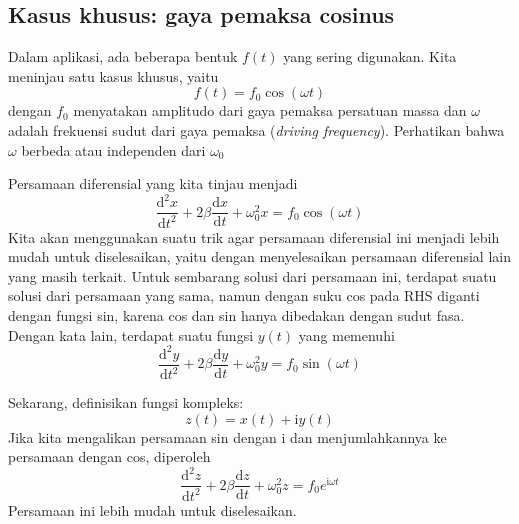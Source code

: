 \subsection{Kasus khusus: gaya pemaksa cosinus}

Dalam aplikasi, ada beberapa bentuk $f(t)$ yang sering digunakan.
Kita meninjau satu kasus khusus, yaitu
\begin{equation}
f(t) = f_{0}\cos(\omega t)
\end{equation}
dengan $f_{0}$ menyatakan amplitudo dari gaya pemaksa persatuan massa
dan $\omega$ adalah frekuensi sudut dari gaya pemaksa (\textit{driving frequency}).
Perhatikan bahwa $\omega$ berbeda atau independen dari $\omega_0$

Persamaan diferensial yang kita tinjau menjadi
\begin{equation}
\frac{\mathrm{d}^{2}x}{\mathrm{d}t^{2}} + 
2\beta\frac{\mathrm{d}x}{\mathrm{d}t} + \omega_{0}^{2}x = f_{0}\cos(\omega t)
\end{equation}
Kita akan menggunakan suatu trik agar persamaan diferensial ini menjadi lebih
mudah untuk diselesaikan, yaitu dengan menyelesaikan persamaan diferensial
lain yang masih terkait.
Untuk sembarang solusi dari persamaan ini, terdapat suatu solusi dari
persamaan yang sama, namun dengan suku cos pada RHS diganti dengan
fungsi sin, karena cos dan sin hanya dibedakan dengan sudut fasa.
Dengan kata lain, terdapat suatu fungsi $y(t)$ yang memenuhi
\begin{equation*}
\frac{\mathrm{d}^{2}y}{\mathrm{d}t^{2}} +
2\beta\frac{\mathrm{d}y}{\mathrm{d}t} + \omega_{0}^{2}y = f_{0}\sin(\omega t)
\end{equation*}

Sekarang, definisikan fungsi kompleks:
\begin{equation*}
z(t) = x(t) + \mathrm{i}y(t)
\end{equation*}
Jika kita mengalikan persamaan sin dengan $\mathrm{i}$ dan menjumlahkannya
ke persamaan dengan cos, diperoleh
\begin{equation*}
\frac{\mathrm{d}^{2}z}{\mathrm{d}t^{2}} +
2\beta\frac{\mathrm{d}z}{\mathrm{d}t} + \omega_{0}^{2}z = f_{0}e^{\mathrm{i}\omega t}
\end{equation*}
Persamaan ini lebih mudah untuk diselesaikan.

